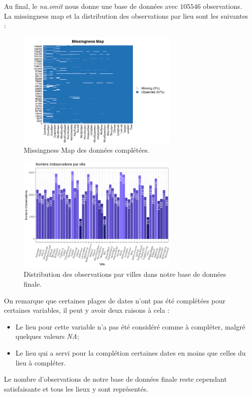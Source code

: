 \documentclass{article}
\begin{document}
Au final, le \emph{na.omit} nous donne une base de données avec $105546$ observations. La missingness map et la distribution des observations par lieu sont les suivantes : 

\begin{figure}[H]
    \centering
    \includegraphics[width=0.7\textwidth]{Images/missmap_completed.png}
    \caption{Missingness Map des données complétées.}
\end{figure}

\begin{figure}[H]
    \centering
    \includegraphics[width=0.7\textwidth]{Images/distribution_lieux_completed.png}
    \caption{Distribution des observations par villes dans notre base de données finale.}
\end{figure}

On remarque que certaines plages de dates n'ont pas été complétées pour certaines variables, il peut y avoir deux raisons à cela : 
\begin{itemize}
    \item Le lieu pour cette variable n'a pas été considéré comme à compléter, malgré quelques valeurs \emph{NA};
    \item Le lieu qui a servi pour la complétion certaines dates en moins que celles du lieu à compléter.
\end{itemize}
Le nombre d'observations de notre base de données finale reste cependant satisfaisante et tous les lieux y sont représentés.

\newpage
\printbibliography
\end{document}
